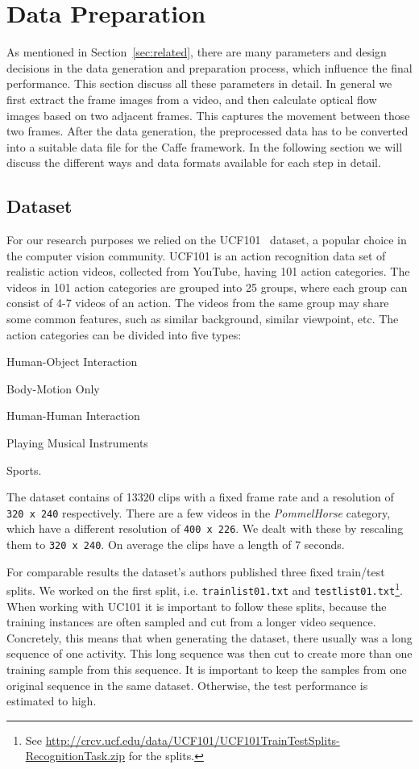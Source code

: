 \section{Data Preparation}
\label{sec:data}

As mentioned in Section~\ref{sec:related}, there are many parameters and design decisions in the data generation and preparation process, which influence the final performance.
This section discuss all these parameters in detail.
In general we first extract the frame images from a video, and then calculate optical flow images based on two adjacent frames.
This captures the movement between those two frames.
After the data generation, the preprocessed data has to be converted into a suitable data file for the Caffe framework.
In the following section we will discuss the different ways and data formats available for each step in detail.

\subsection{Dataset}
For our research purposes we relied on the UCF101~\cite{soomro2012ucf101} dataset, a popular choice in the computer vision community.
UCF101 is an action recognition data set of realistic action videos, collected from YouTube, having 101 action categories.
The videos in 101 action categories are grouped into 25 groups, where each group can consist of 4-7 videos of an action.
The videos from the same group may share some common features, such as similar background, similar viewpoint, etc.
The action categories can be divided into five types:
\begin{enumerate*}
	\item Human-Object Interaction
	\item Body-Motion Only
	\item Human-Human Interaction
	\item Playing Musical Instruments
	\item Sports.
\end{enumerate*}
The dataset contains of 13320 clips with a fixed frame rate and a resolution of \texttt{320 x 240} respectively.
There are a few videos in the \emph{PommelHorse} category, which have a different resolution of \texttt{400 x 226}.
We dealt with these by rescaling them to \texttt{320 x 240}.
On average the clips have a length of 7 seconds.

For comparable results the dataset's authors published three fixed train/test splits.
We worked on the first split, i.e. \texttt{trainlist01.txt} and \texttt{testlist01.txt}\footnote{See \url{http://crcv.ucf.edu/data/UCF101/UCF101TrainTestSplits-RecognitionTask.zip} for the splits.}.
When working with UC101 it is important to follow these splits, because the training instances are often sampled and cut from a longer video sequence.
Concretely, this means that when generating the dataset, there usually was a long sequence of one activity.
This long sequence was then cut to create more than one training sample from this sequence.
It is important to keep the samples from one original sequence in the same dataset.
Otherwise, the test performance is estimated to high.


